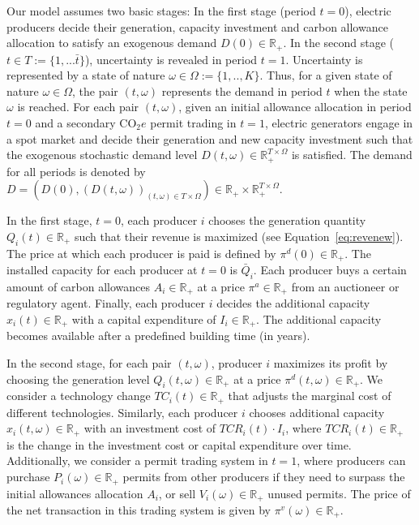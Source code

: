 \documentclass[11pt, letterpaper]{article}
\begin{document}
\smallskip

Our model assumes two basic stages: In the first stage (period $t=0$), electric producers decide their generation, capacity investment and carbon allowance allocation to satisfy an exogenous demand $D(0)\in\mathbb{R}_+$. In the second stage ($t\in T:=\{1,...\bar{t}\}$), uncertainty is revealed in period $t=1$. Uncertainty is represented by a state of nature $\omega\in\Omega:=\{1,..,K\}$. Thus, for a given state of nature $\omega\in\Omega$, the pair $(t,\omega)$ represents the demand in period $t$ when the state $\omega$ is reached. For each pair $(t,\omega)$, given an initial allowance allocation in period $t=0$ and a secondary CO$_2e$ permit trading in $t=1$, electric generators engage in a spot market and decide their generation and new capacity investment such that the exogenous stochastic demand level $D(t,\omega)\in\mathbb{R}_+^{T\times\Omega}$ is satisfied. The demand for all periods is denoted by $D=\left(D(0),(D(t,\omega))_{(t,\omega)\in T\times\Omega}\right)\in\mathbb{R}_+\times\mathbb{R}_+^{T\times\Omega}$.

\smallskip
In the first stage, $t=0$, each producer $i$ chooses the generation quantity $Q_i(t)\in\mathbb{R}_+$ such that their revenue is maximized (see Equation~\ref{eq:revenew}). The price at which each producer is paid is defined by $\pi^d(0)\in\mathbb{R}_+$. The installed capacity for each producer at $t=0$ is $\bar{Q}_i$. Each producer buys a certain amount of carbon allowances $A_i\in\mathbb{R}_+$ at a price $\pi^{a}\in\mathbb{R}_+$ from an auctioneer or regulatory agent. Finally, each producer $i$ decides the additional capacity $x_i(t)\in\mathbb{R}_+$ with a capital expenditure of $I_i\in\mathbb{R}_+$. The additional capacity becomes available after a predefined building time (in years). 

\smallskip
In the second stage, for each pair $(t,\omega)$, producer $i$ maximizes its profit by choosing the generation level $Q_i(t,\omega)\in\mathbb{R}_+$ at a price $\pi^d(t,\omega)\in\mathbb{R}_+$. We consider a technology change $TC_i(t) \in\mathbb{R}_+$ that adjusts the marginal cost of different technologies. Similarly, each producer $i$ chooses additional capacity $x_i(t,\omega)\in\mathbb{R}_+$ with an investment cost of $TCR_i(t)\cdot I_i$, where $TCR_i(t)\in\mathbb{R}_+$ is the change in the investment cost or capital expenditure over time. Additionally, we consider a permit trading system in $t=1$, where producers can purchase $P_i(\omega)\in\mathbb{R}_+$ permits from other producers if they need to surpass the initial allowances allocation $A_i$, or sell $V_i(\omega)\in\mathbb{R}_+$ unused permits. The price of the net transaction in this trading system is given by $\pi^v(\omega)\in\mathbb{R}_+$.
\end{document}
